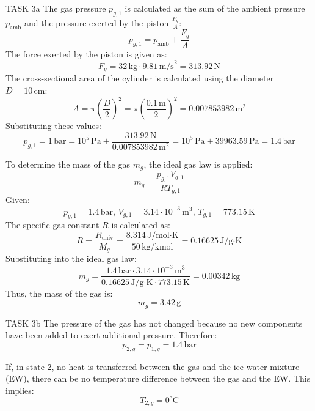 TASK 3a  
The gas pressure \( p_{g,1} \) is calculated as the sum of the ambient pressure \( p_{\text{amb}} \) and the pressure exerted by the piston \( \frac{F_g}{A} \):  
\[
p_{g,1} = p_{\text{amb}} + \frac{F_g}{A}
\]  
The force exerted by the piston is given as:  
\[
F_g = 32 \, \text{kg} \cdot 9.81 \, \text{m/s}^2 = 313.92 \, \text{N}
\]  
The cross-sectional area of the cylinder is calculated using the diameter \( D = 10 \, \text{cm} \):  
\[
A = \pi \left( \frac{D}{2} \right)^2 = \pi \left( \frac{0.1 \, \text{m}}{2} \right)^2 = 0.007853982 \, \text{m}^2
\]  
Substituting these values:  
\[
p_{g,1} = 1 \, \text{bar} = 10^5 \, \text{Pa} + \frac{313.92 \, \text{N}}{0.007853982 \, \text{m}^2} = 10^5 \, \text{Pa} + 39963.59 \, \text{Pa} = 1.4 \, \text{bar}
\]  

To determine the mass of the gas \( m_g \), the ideal gas law is applied:  
\[
m_g = \frac{p_{g,1} V_{g,1}}{R T_{g,1}}
\]  
Given:  
\[
p_{g,1} = 1.4 \, \text{bar}, \, V_{g,1} = 3.14 \cdot 10^{-3} \, \text{m}^3, \, T_{g,1} = 773.15 \, \text{K}
\]  
The specific gas constant \( R \) is calculated as:  
\[
R = \frac{R_{\text{univ}}}{M_g} = \frac{8.314 \, \text{J/mol·K}}{50 \, \text{kg/kmol}} = 0.16625 \, \text{J/g·K}
\]  
Substituting into the ideal gas law:  
\[
m_g = \frac{1.4 \, \text{bar} \cdot 3.14 \cdot 10^{-3} \, \text{m}^3}{0.16625 \, \text{J/g·K} \cdot 773.15 \, \text{K}} = 0.00342 \, \text{kg}
\]  
Thus, the mass of the gas is:  
\[
m_g = 3.42 \, \text{g}
\]  

TASK 3b  
The pressure of the gas has not changed because no new components have been added to exert additional pressure. Therefore:  
\[
p_{2,g} = p_{1,g} = 1.4 \, \text{bar}
\]  

If, in state 2, no heat is transferred between the gas and the ice-water mixture (EW), there can be no temperature difference between the gas and the EW. This implies:  
\[
T_{2,g} = 0^\circ\text{C}
\]  